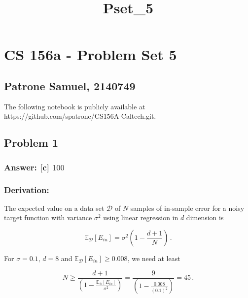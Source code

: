 \documentclass[11pt]{article}
\title{Pset\_5}
\begin{document}
    
    \maketitle
    
    

    
    \hypertarget{cs-156a---problem-set-5}{%
\section{CS 156a - Problem Set 5}\label{cs-156a---problem-set-5}}

\hypertarget{patrone-samuel-2140749}{%
\subsection{Patrone Samuel, 2140749}\label{patrone-samuel-2140749}}

The following notebook is publicly available at
https://github.com/spatrone/CS156A-Caltech.git.

    \hypertarget{problem-1}{%
\subsection{Problem 1}\label{problem-1}}

\hypertarget{answer-c-100}{%
\subsubsection{\texorpdfstring{Answer: {[}c{]}
\(100\)}{Answer: {[}c{]} 100}}\label{answer-c-100}}

\hypertarget{derivation}{%
\subsubsection{Derivation:}\label{derivation}}

The expected value on a data set \(\mathcal{D}\) of \(N\) samples of
in-sample error for a noisy target function with variance \(\sigma^2\)
using linear regression in \(d\) dimension is

\begin{equation}
\mathbb{E}_{\mathcal{D}}[E_{in}]=\sigma^2\left(1-\frac{d+1}{N}\right)\,.
\end{equation}

For \(\sigma=0.1\), \(d=8\) and
\(\mathbb{E}_{\mathcal{D}}[E_{in}]\ge 0.008\), we need at least

\begin{equation}
N\ge\frac{d+1}{\left(1-\frac{\mathbb{E}_{\mathcal{D}}[E_{in}]}{\sigma^2}\right)}=\frac{9}{\left(1-\frac{0.008}{(0.1)^2}\right)}=45\,.
\end{equation}
\end{document}
